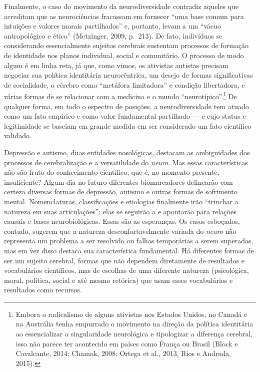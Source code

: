 Finalmente, o caso do movimento da neurodiversidade contradiz aqueles
que acreditam que as neurociências fracassam em fornecer ``uma base
comum para intuições e valores morais partilhados'' e, portanto, levam a
um ``vácuo antropológico e ético'' (Metzinger, 2009, p.~213). De fato,
indivíduos se considerando essencialmente sujeitos cerebrais sustentam
processos de formação de identidade nos planos individual, social e
comunitário. O processo de modo algum é em linha reta, já que, como
vimos, os ativistas autistas precisam negociar sua política identitária
neurocêntrica, um desejo de formas significativas de socialidade, o
cérebro como ``metáfora limitadora'' e condição libertadora, e várias
formas de se relacionar com a medicina e o mundo
``neurotípico''.\footnote[33]{Embora o radicalismo de alguns ativistas nos Estados Unidos, no
Canadá e na Austrália tenha empurrado o movimento na direção da política
identitária ao essencializar a singularidade neurológica e tipologizar a
diferença cerebral, isso não parece ter acontecido em países como França
ou Brasil (Block e Cavalcante, 2014; Chamak, 2008; Ortega et al., 2013,
Rios e Andrada, 2015).} De qualquer forma, em todo o
espectro de posições, a neurodiversidade tem atuado como um fato
empírico e como valor fundamental partilhado --- e cujo status e
legitimidade se baseiam em grande medida em ser considerado um fato
científico validado.

Depressão e autismo, duas entidades nosológicas, destacam as
ambiguidades dos processos de cerebralização e a versatilidade do
\emph{neuro}. Mas essas características não são fruto do conhecimento
científico, que é, no momento presente, insuficiente? Algum dia no
futuro diferentes biomarcadores delinearão com certeza diversas formas
de depressão, autismo e outras formas de sofrimento mental.
Nomenclaturas, classificações e etiologias finalmente irão ``trinchar a
natureza em suas articulações''; elas se seguirão a e apontarão para
relações causais e bases neurobiológicas. Essas são as esperanças. Os
casos esboçados, contudo, sugerem que a natureza desconfortavelmente
variada do \emph{neuro} não representa um problema a ser resolvido ou
falhas temporárias a serem superadas, mas em vez disso destaca sua
característica fundamental. Há diferentes formas de ser um sujeito
cerebral, formas que não dependem diretamente de resultados e
vocabulários científicos, mas de escolhas de uma diferente natureza
(psicológica, moral, política, social e até mesmo retórica) que usam
esses vocabulários e resultados como recursos.

